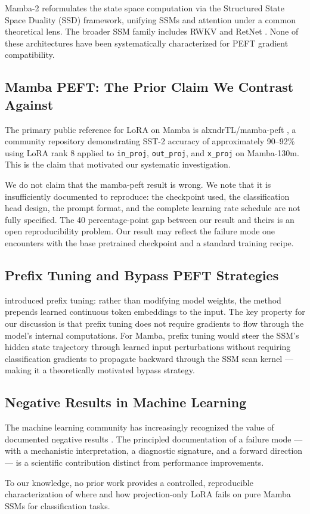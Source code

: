 Mamba-2 \citep{dao2024mamba2} reformulates the state space computation via the Structured State Space Duality (SSD) framework, unifying SSMs and attention under a common theoretical lens. The broader SSM family includes RWKV \citep{peng2023rwkv} and RetNet \citep{sun2023retnet}. None of these architectures have been systematically characterized for PEFT gradient compatibility.

\subsection{Mamba PEFT: The Prior Claim We Contrast Against}

The primary public reference for LoRA on Mamba is alxndrTL/mamba-peft \citep{alxndrtl2024mambapeft}, a community repository demonstrating SST-2 accuracy of approximately 90--92\% using LoRA rank 8 applied to \texttt{in\_proj}, \texttt{out\_proj}, and \texttt{x\_proj} on Mamba-130m. This is the claim that motivated our systematic investigation.

We do not claim that the mamba-peft result is wrong. We note that it is insufficiently documented to reproduce: the checkpoint used, the classification head design, the prompt format, and the complete learning rate schedule are not fully specified. The 40 percentage-point gap between our result and theirs is an open reproducibility problem. Our result may reflect the failure mode one encounters with the base pretrained checkpoint and a standard training recipe.

\subsection{Prefix Tuning and Bypass PEFT Strategies}

\citet{li2021prefix} introduced prefix tuning: rather than modifying model weights, the method prepends learned continuous token embeddings to the input. The key property for our discussion is that prefix tuning does not require gradients to flow through the model's internal computations. For Mamba, prefix tuning would steer the SSM's hidden state trajectory through learned input perturbations without requiring classification gradients to propagate backward through the SSM scan kernel --- making it a theoretically motivated bypass strategy.

\subsection{Negative Results in Machine Learning}

The machine learning community has increasingly recognized the value of documented negative results \citep{sinha2021reproducibility}. The principled documentation of a failure mode --- with a mechanistic interpretation, a diagnostic signature, and a forward direction --- is a scientific contribution distinct from performance improvements.

To our knowledge, no prior work provides a controlled, reproducible characterization of where and how projection-only LoRA fails on pure Mamba SSMs for classification tasks.
